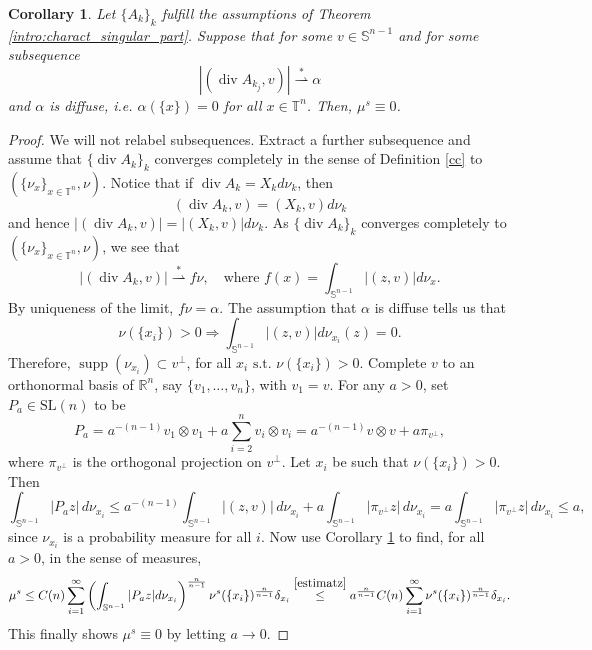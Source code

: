 \documentclass[10pt,reqno]{amsart}
\numberwithin{equation}{section}
\newcommand{\weak}{\overset{*}{\rightharpoonup}}
\newcommand{\R}{\mathbb{R}}
\newcommand{\T}{\mathbb{T}}
\DeclareMathOperator{\dv}{div}
\DeclareMathOperator{\spt}{supp}
\theoremstyle{plain}
\newtheorem{Cor}[Teo]{Corollary}
\theoremstyle{definition}
\theoremstyle{remark}
\begin{document}
\begin{Cor}\label{cor2}
Let $\{A_k\}_k$ fulfill the assumptions of Theorem \ref{intro:charact_singular_part}. Suppose that for some $v \in \mathbb{S}^{n-1}$ and for some subsequence
\[
|(\dv A_{k_j},v)| \weak \alpha
\]
and $\alpha$ is diffuse, i.e. $\alpha(\{x\}) = 0$ for all $x \in \T^n$. Then, $\mu^s \equiv 0$.
\end{Cor}
\begin{proof}
We will not relabel subsequences. Extract a further subsequence and assume that $\{\dv A_k\}_k$ converges completely in the sense of Definition \ref{cc} to $(\{\nu_x\}_{x \in \T^n},\nu)$. Notice that if $\dv A_k = X_kd\nu_k$, then
\[
(\dv A_k, v) = (X_k,v)d\nu_k
\]
and hence $|(\dv A_k, v)| = |(X_k,v)|d\nu_k.$ As $\{ \dv A_k\}_{k}$ converges completely to $(\{\nu_x\}_{x \in \T^n},\nu)$, we see that
\[
|(\dv A_k, v)| \weak  f\nu, \quad \text{where } f(x) = \int_{\mathbb{S}^{n-1}}|(z,v)|d\nu_x.
\]
By uniqueness of the limit, $f \nu = \alpha$. The assumption that $\alpha$ is diffuse tells us that 
\[
\nu(\{x_i\}) > 0 \Rightarrow \int_{\mathbb{S}^{n-1}}|(z,v)|d\nu_{x_i}(z) = 0.
\]
Therefore, $\spt(\nu_{x_i}) \subset v^\perp$, for all $\text{$x_i$ s.t. } \nu(\{x_i\}) > 0.$ Complete $v$ to an orthonormal basis of $\R^n$,  say $\{v_1,\dots, v_n\}$,  with $v_1 = v$. For any $a>0$, set $P_a \in \text{SL}(n)$ to be
\[
P_a = a^{-(n-1)} v_1\otimes v_1 + a\sum_{i = 2}^n v_i\otimes v_i = a^{-(n-1)}v\otimes v +  a\pi_{v^\perp},
\]
where $\pi_{v^\perp}$ is the orthogonal projection on $v^\perp$. Let $x_i$ be such that $\nu(\{x_i\}) > 0$. Then
\begin{equation}\label{estimatz}
\int_{\mathbb{S}^{n-1}}|P_az|\,d\nu_{x_i} \le a^{-(n-1)}\int_{\mathbb{S}^{n-1}}|(z,v)|\,d\nu_{x_i} + a\int_{\mathbb{S}^{n-1}}|\pi_{v^\perp}z|\,d\nu_{x_i} = a\int_{\mathbb{S}^{n-1}}|\pi_{v^\perp}z|\,d\nu_{x_i} \le a,
\end{equation}
since $\nu_{x_i}$ is a probability measure for all $i$. Now use Corollary \ref{cor2} to find, for all $a > 0$, in the sense of measures,
\[
\mu^s\leq C(n) \sum_{i=1}^\infty \left(\int_{\mathbb{S}^{n-1}}|P_az|d\nu_{x_i}\right)^\frac{n}{n - 1}\nu^s(\{x_i\})^\frac{n}{n-1}\delta_{x_i} \overset{\eqref{estimatz}}{\le}  a^\frac{n}{n - 1}C(n) \sum_{i=1}^\infty \nu^s(\{x_i\})^\frac{n}{n-1}\delta_{x_i}.
\]
This finally shows $\mu^s \equiv 0$ by letting $a\rightarrow 0$.
\end{proof}
\end{document}

